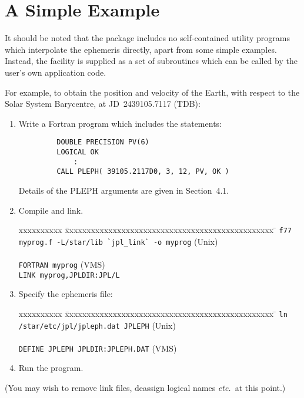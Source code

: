 \section{A Simple Example}
It should be noted that the package includes
no self-contained utility programs which
interpolate the ephemeris directly, apart from some
simple examples.  Instead, the
facility is supplied as a set of subroutines which can be
called by the user's own application code.

For example, to obtain the position and velocity of
the Earth, with respect to the Solar System Barycentre,
at JD~2439105.7117 (TDB):
\begin{enumerate}
\item Write a Fortran program which includes the statements:
\begin{verbatim}
         DOUBLE PRECISION PV(6)
         LOGICAL OK
             :
         CALL PLEPH( 39105.2117D0, 3, 12, PV, OK )
\end{verbatim}
Details of the PLEPH arguments are given in Section~4.1.
\item Compile and link.
\begin{tabbing}
xxxxxxxxxx \= xxxxxxxxxxxxxxxxxxxxxxxxxxxxxxxxxxxxxxxxxxxxxxxx \= \kill
\> \verb|f77 myprog.f -L/star/lib `jpl_link` -o myprog| \> (Unix) \\ \\
\> \verb|FORTRAN myprog| \> (VMS) \\
\> \verb|LINK myprog,JPLDIR:JPL/L|
\end{tabbing}
\item Specify the ephemeris file:
\begin{tabbing}
xxxxxxxxxx \= xxxxxxxxxxxxxxxxxxxxxxxxxxxxxxxxxxxxxxxxxxxxxxxx \= \kill
\> \verb|ln /star/etc/jpl/jpleph.dat JPLEPH| \> (Unix) \\ \\
\> \verb|DEFINE JPLEPH JPLDIR:JPLEPH.DAT| \> (VMS)
\end{tabbing}
\item Run the program.
\end{enumerate}
(You may wish to remove link files, deassign logical names
{\it etc.}\ at this point.)

